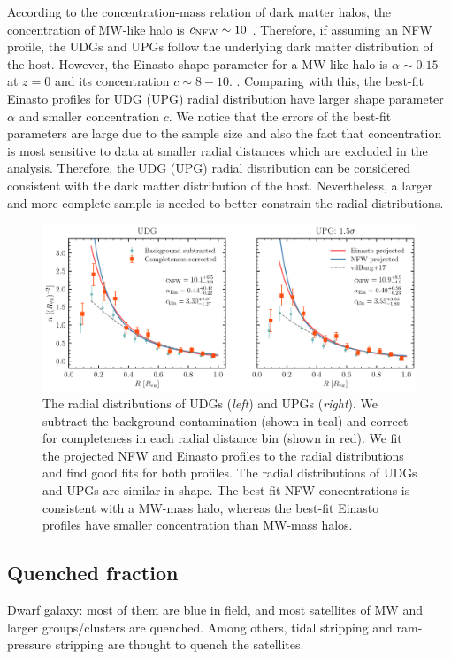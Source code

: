 \documentclass[twocolumn,astrosymb,twocolappendix]{aastex631}
\begin{document}
\begin{CJK*}{UTF8}{gbsn}
According to the concentration-mass relation of dark matter halos, the concentration of MW-like halo is $c_{\rm NFW} \sim 10$ \citep{Bullock2001,Duffy2008,Dutton2014}. Therefore, if assuming an NFW profile, the UDGs and UPGs follow the underlying dark matter distribution of the host. However, the Einasto shape parameter for a MW-like halo is $\alpha\sim 0.15$ at $z=0$ and its concentration $c\sim 8-10$. \citep{Gao2008,Dutton2014}. Comparing with this, the best-fit Einasto profiles for UDG (UPG) radial distribution have larger shape parameter $\alpha$ and smaller concentration $c$. We notice that the errors of the best-fit parameters are large due to the sample size and also the fact that concentration is most sensitive to data at smaller radial distances which are excluded in the analysis. Therefore, the UDG (UPG) radial distribution can be considered consistent with the dark matter distribution of the host. Nevertheless, a larger and more complete sample is needed to better constrain the radial distributions. 

\begin{figure}
	\vbox{ 
		\centering
		\includegraphics[width=1\linewidth]{radial_distribution.pdf}
	}
    \caption{The radial distributions of UDGs (\textit{left}) and UPGs (\textit{right}). We subtract the background contamination (shown in teal) and correct for completeness in each radial distance bin (shown in red). We fit the projected NFW and Einasto profiles to the radial distributions and find good fits for both profiles. The radial distributions of UDGs and UPGs are similar in shape. The best-fit NFW concentrations is consistent with a MW-mass halo, whereas the best-fit Einasto profiles have smaller concentration than MW-mass halos.}
    \label{fig:radial_distribution}
\end{figure}


\subsection{Quenched fraction}\label{sec:quench}
Dwarf galaxy: most of them are blue in field, and most satellites of MW and larger groups/clusters are quenched. Among others, tidal stripping and ram-pressure stripping are thought to quench the satellites. 


\end{CJK*}
\end{document}
